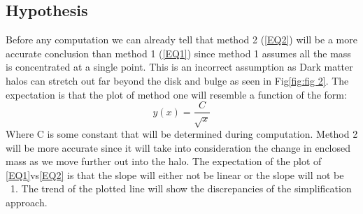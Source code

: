 \documentclass[fleqn,usenatbib]{mnras}
\begin{document}
\subsection{Hypothesis}
\label{sec:Hypothesis}
Before any computation we can already tell that method 2 (\ref{EQ2}) will be a more accurate conclusion than method 1 (\ref{EQ1}) since method 1 assumes all the mass is concentrated at a single point. This is an incorrect assumption as Dark matter halos can stretch out far beyond the disk and bulge as seen in Fig\ref{fig:fig 2}. The expectation is that the plot of method one will resemble a function of the form:
\begin{equation}
    y(x) = \frac{C}{\sqrt{x}}
    \label{EQ4}
\end{equation}
Where C is some constant that will be determined during computation. Method 2 will be more accurate since it will take into consideration the change in enclosed mass as we move further out into the halo. 
The expectation of the plot of \ref{EQ1}vs\ref{EQ2} is that the slope will either not be linear or the slope will not be ~1. The trend of the plotted line will show the discrepancies of the simplification approach.









\bsp	%
\label{lastpage}
\end{document}
